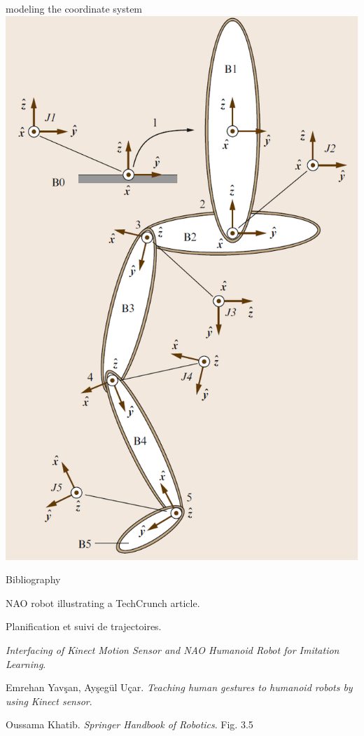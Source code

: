 \documentclass{beamer}
\begin{document}
\begin{frame}[allowframebreaks]{modeling the coordinate system}
\includegraphics[scale = 0.3]{joints.png}\cite{4}
\end{frame}

\begin{frame}[allowframebreaks]{Bibliography}
\begin{thebibliography}{9}

NAO robot illustrating a TechCrunch article.

Planification et suivi de trajectoires. 
 
\textit{Interfacing of Kinect Motion Sensor and NAO Humanoid Robot for Imitation Learning}. 

Emrehan Yavşan, Ayşegül Uçar. 
\textit{Teaching human gestures to humanoid robots by using Kinect sensor}. 
 
Oussama Khatib.
\textit{Springer Handbook of Robotics}.
 Fig. 3.5
\end{thebibliography}

\end{frame}
\end{document}
